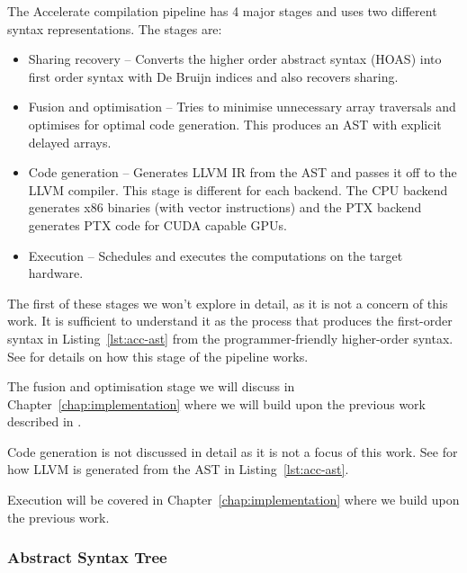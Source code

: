 The Accelerate compilation pipeline has 4 major stages and uses two different syntax representations. The stages are:
%
\begin{itemize}
%
\item Sharing recovery -- Converts the higher order abstract syntax (HOAS) into first order syntax with De Bruijn indices and also recovers sharing.
%
%
\item Fusion and optimisation -- Tries to minimise unnecessary array traversals and optimises for optimal code generation. This produces an AST with explicit delayed arrays.
%
\item Code generation -- Generates LLVM IR from the AST and passes it off to the LLVM compiler. This stage is different for each backend. The CPU backend generates x86 binaries (with vector instructions) and the PTX backend generates PTX code for CUDA capable GPUs.
%
\item Execution -- Schedules and executes the computations on the target hardware.
\end{itemize}
%

The first of these stages we won't explore in detail, as it is not a concern of this work. It is sufficient to understand it as the process that produces the first-order syntax in Listing~\ref{lst:acc-ast} from the programmer-friendly higher-order syntax. See \citet{McDonell:acc-optim} for details on how this stage of the pipeline works.

The fusion and optimisation stage we will discuss in Chapter~\ref{chap:implementation} where we will build upon the previous work described in \citet{McDonell:acc-optim}.

Code generation is not discussed in detail as it is not a focus of this work. See \citet{McDonell:2015:acc-llvm} for how LLVM is generated from the AST in Listing~\ref{lst:acc-ast}.

Execution will be covered in Chapter~\ref{chap:implementation} where we build upon the previous work\cite{McDonell:acc-optim,McDonell:2015:acc-llvm,Chakravarty:acc-cuda}.

\subsubsection{Abstract Syntax Tree}


